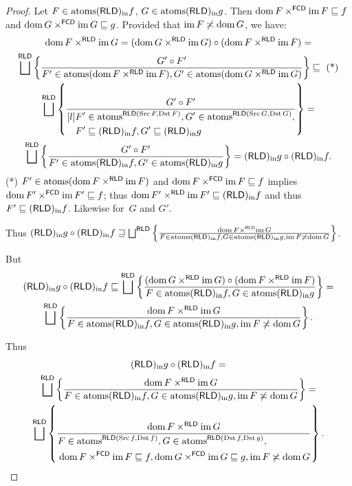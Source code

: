 \begin{proof}
Let $F\in\operatorname{atoms}(\mathsf{RLD})_{\mathrm{in}} f$, $G\in\operatorname{atoms}(\mathsf{RLD})_{\mathrm{in}} g$. Then $\operatorname{dom} F\times^{\mathsf{FCD}}\operatorname{im} F\sqsubseteq f$ and $\operatorname{dom} G\times^{\mathsf{FCD}}\operatorname{im} G\sqsubseteq g$.
Provided that $\operatorname{im} F\not\asymp\operatorname{dom} G$, we have:
\begin{multline*}
\dom F\times^{\mathsf{RLD}}\im G=(\dom G\times^{\mathsf{RLD}}\im G)\circ(\dom F\times^{\mathsf{RLD}}\im F)=\\
\bigsqcup^{\mathsf{RLD}}\setcond{G'\circ F'}{F'\in\atoms(\dom F\times^{\mathsf{RLD}}\im F),G'\in\atoms(\dom G\times^{\mathsf{RLD}}\im G)}\sqsubseteq\text{ (*)}\\
\bigsqcup^{\mathsf{RLD}}\setcond{G'\circ F'}{
\begin{aligned}[l]
&F'\in\atoms^{\mathsf{RLD}(\Src F,\Dst F)},G'\in\atoms^{\mathsf{RLD}(\Src G,\Dst G)},\\
&F'\sqsubseteq\torldin f,G'\sqsubseteq\torldin g
\end{aligned}
}=\\
\bigsqcup^{\mathsf{RLD}}\setcond{G'\circ F'}{F'\in\atoms\torldin f,G'\in\atoms\torldin g}=\torldin g\circ\torldin f.
\end{multline*}
(*) $F'\in\operatorname{atoms}(\operatorname{dom} F\times^{\mathsf{RLD}}\operatorname{im} F)$ and $\operatorname{dom} F\times^{\mathsf{FCD}}\operatorname{im} F\sqsubseteq f$ implies $\operatorname{dom} F'\times^{\mathsf{FCD}}\operatorname{im} F'\sqsubseteq f$;
thus $\operatorname{dom} F'\times^{\mathsf{RLD}}\operatorname{im} F'\sqsubseteq (\mathsf{RLD})_{\mathrm{in}} f$ and thus $F'\sqsubseteq (\mathsf{RLD})_{\mathrm{in}} f$. Likewise for~$G$ and $G'$.

Thus $\torldin g\circ\torldin f\sqsupseteq\bigsqcup^{\mathsf{RLD}}\setcond{\dom F\times^{\mathsf{RLD}}\im G}{F\in\atoms\torldin f,G\in\atoms\torldin g,\im F\nasymp\dom G}$.

But
\begin{multline*}
\torldin g\circ\torldin f\sqsubseteq\bigsqcup^{\mathsf{RLD}}\setcond{(\dom G\times^{\mathsf{RLD}}\im G)\circ(\dom F\times^{\mathsf{RLD}}\im F)}{F\in\atoms\torldin f,G\in\atoms\torldin g}
=\\
\bigsqcup^{\mathsf{RLD}}\setcond{\dom F\times^{\mathsf{RLD}}\im G}{F\in\atoms\torldin f,G\in\atoms\torldin g,\im F\nasymp\dom G}.
\end{multline*}

Thus 
\begin{multline*}
\torldin g\circ\torldin f=\\
\bigsqcup^{\mathsf{RLD}}\setcond{\dom F\times^{\mathsf{RLD}}\im G}{F\in\atoms\torldin f,G\in\atoms\torldin g,\im F\nasymp\dom G}=\\
\bigsqcup^{\mathsf{RLD}}\setcond{\dom F\times^{\mathsf{RLD}}\im G}{
\begin{aligned}&F\in\atoms^{\mathsf{RLD}(\Src f,\Dst f)},G\in\atoms^{\mathsf{RLD}(\Dst f,\Dst g)},\\&\dom F\times^{\mathsf{FCD}}\im F\sqsubseteq f,\dom G\times^{\mathsf{FCD}}\im G\sqsubseteq g,\im F\nasymp\dom G\end{aligned}}.
\end{multline*}



\end{proof}
